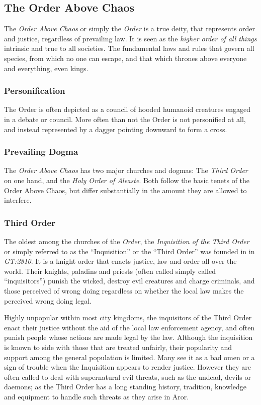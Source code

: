 \subsection{The Order Above Chaos}

The \emph{Order Above Chaos} or simply the \emph{Order} is a true deity, that
represents order and justice, regardless of prevailing law. It is seen as the
\emph{higher order of all things} intrinsic and true to all societies. The
fundamental laws and rules that govern all species, from which no one can
escape, and that which thrones above everyone and everything, even kings.

\subsubsection*{Personification}

The Order is often depicted as a council of hooded humanoid creatures engaged
in a debate or council. More often than not the Order is not personified at
all, and instead represented by a dagger pointing downward to form a cross.

\subsubsection*{Prevailing Dogma}

The \emph{Order Above Chaos} has two major churches and dogmas: The
\emph{Third Order} on one hand, and the \emph{Holy Order of Aleaste}. Both
follow the basic tenets of the Order Above Chaos, but differ substantially in
the amount they are allowed to interfere.

\subsubsection*{Third Order}

The oldest among the churches of the \emph{Order}, the \emph{Inquisition of
  the Third Order} or simply referred to as the ``Inquisition'' or the
``Third Order'' was founded in in \emph{GT:2810}. It is a knight order that
enacts justice, law and order all over the world. Their knights, paladins and
priests (often called simply called ``inquisitors'') punish the wicked, destroy
evil creatures and charge criminals, and those perceived of wrong doing
regardless on whether the local law makes the perceived wrong doing legal.

Highly unpopular within most city kingdoms, the inquisitors of the Third Order
enact their justice without the aid of the local law enforcement agency, and
often punish people whose actions are made legal by the law. Although the
inquisition is known to side with those that are treated unfairly, their
popularity and support among the general population is limited. Many see it
as a bad omen or a sign of trouble when the Inquisition appears to render
justice. However they are often called to deal with supernatural evil threats,
such as the undead, devils or daemons; as the Third Order has a long standing
history, tradition, knowledge and equipment to handle such threats as they
arise in Aror.

